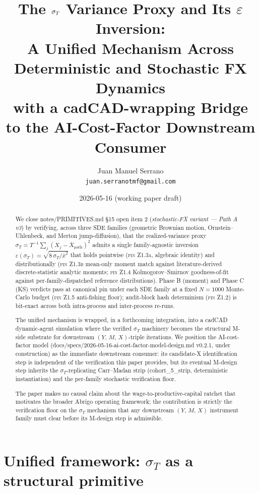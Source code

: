 \documentclass[11pt,letterpaper]{article}
\title{%
    The $\sigmaT$ Variance Proxy and Its $\varepsilon$ Inversion: \\
    A Unified Mechanism Across Deterministic and Stochastic FX Dynamics \\
    \large with a cadCAD-wrapping Bridge to the AI-Cost-Factor Downstream Consumer
}
\author{%
    Juan Manuel Serrano \\
    \texttt{juan.serranotmf@gmail.com}
}
\date{2026-05-16 \quad (working paper draft)}
\newcommand{\sigmaT}{\sigma_{T}}
\newcommand{\xbar}{\bar{x}}
\newcommand{\Ymx}{(Y,\,M,\,X)}
\newcommand{\PinZ}[1]{\textsc{pin Z1.#1}}
\begin{document}
\maketitle

\begin{abstract}
We close \textsf{notes/PRIMITIVES.md} \S15 open item 2 (\emph{stochastic-FX
variant — Path A v3}) by verifying, across three SDE families (geometric
Brownian motion, Ornstein--Uhlenbeck, and Merton jump-diffusion), that the
realized-variance proxy
\(\sigmaT = T^{-1} \sum_{j} (X_j - \bar X_{\text{path}})^2\)
admits a single family-agnostic inversion
\(\varepsilon(\sigmaT) = \sqrt{8\,\sigmaT/\xbar^{2}}\)
that holds pointwise (\PinZ{3a}, algebraic identity) and distributionally
(\PinZ{3b} mean-only moment match against literature-derived discrete-statistic
analytic moments; \PinZ{4} Kolmogorov--Smirnov goodness-of-fit against
per-family-dispatched reference distributions). Phase B (moment) and
Phase C (KS) verdicts pass at canonical pin under each SDE family at a fixed
\(N = 1000\) Monte-Carlo budget (\PinZ{5} anti-fishing floor); audit-block
hash determinism (\PinZ{2}) is bit-exact across both intra-process and
inter-process re-runs.

The unified mechanism is wrapped, in a forthcoming integration, into a
cadCAD dynamic-agent simulation where the verified $\sigmaT$ machinery
becomes the structural M-side substrate for downstream
\(\Ymx\)-triple iterations. We position the AI-cost-factor model
(\textsf{docs/specs/2026-05-16-ai-cost-factor-model-design.md} v0.2.1,
under construction) as the immediate downstream consumer: its candidate-X
identification step is independent of the verification this paper provides,
but its eventual M-design step inherits the \(\sigmaT\)-replicating
Carr--Madan strip (\textsf{cohort\_5\_strip}, deterministic instantiation)
and the per-family stochastic verification floor.

The paper makes no causal claim about the wage-to-productive-capital
ratchet that motivates the broader Abrigo operating framework; the
contribution is strictly the verification floor on the $\sigmaT$ mechanism
that any downstream \(\Ymx\) instrument family must clear before its
M-design step is admissible.
\end{abstract}

\tableofcontents

\section{Unified framework: $\sigmaT$ as a structural primitive}
\label{sec:framework}
\end{document}

